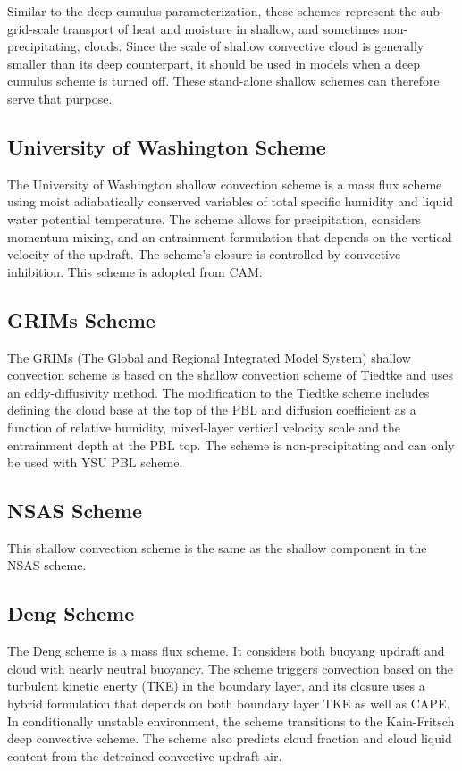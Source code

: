 Similar to the deep cumulus parameterization, these schemes represent the sub-grid-scale transport of heat 
and moisture in shallow, and sometimes non-precipitating, clouds. Since the scale of shallow convective
cloud is generally smaller than its deep counterpart, it should be used in models when a deep cumulus
scheme is turned off. These stand-alone shallow schemes can therefore serve that purpose. 

\subsection{University of Washington Scheme}

The University of Washington shallow convection scheme is a mass flux scheme \citep{park09} using moist 
adiabatically conserved variables of total specific humidity and liquid water potential 
temperature. The scheme allows for precipitation, considers momentum mixing, and an entrainment 
formulation that depends on the vertical velocity of the updraft. The scheme's closure is 
controlled by convective inhibition. This scheme is adopted from CAM.

\subsection{GRIMs Scheme}

The GRIMs (The Global and Regional Integrated Model System) shallow convection scheme \citep{hong18} is based 
on the shallow convection scheme of Tiedtke and uses an eddy-diffusivity method. The modification 
to the Tiedtke scheme includes defining the cloud base at the top of the PBL and diffusion 
coefficient as a function of relative humidity, mixed-layer vertical velocity scale and the 
entrainment depth at the PBL top. The scheme is non-precipitating and can only be used with YSU PBL scheme.

\subsection{NSAS Scheme}

This shallow convection scheme is the same as the shallow component in the NSAS scheme.

\subsection{Deng Scheme}

The Deng scheme \citep{deng03} is a mass flux scheme. It considers both buoyang updraft and cloud with nearly neutral buoyancy.
The scheme triggers convection based on the turbulent kinetic enerty (TKE) in the boundary layer, and its closure uses a
hybrid formulation that depends on both boundary layer TKE as well as CAPE.
In conditionally unstable environment, the scheme transitions to the Kain-Fritsch deep convective scheme.
The scheme also predicts cloud fraction and cloud liquid content from the detrained convective updraft air.

